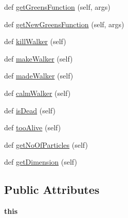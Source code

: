 \begin{DoxyCompactItemize}
\item 
def \hyperlink{classMontePython__cxx_1_1Walker_a0db4aec2ead92c5aec354c95ef433f41}{get\+Greens\+Function} (self, args)
\item 
def \hyperlink{classMontePython__cxx_1_1Walker_a26200102407bd7c0b87458f37d98bd94}{get\+New\+Greens\+Function} (self, args)
\item 
def \hyperlink{classMontePython__cxx_1_1Walker_a471dad9cff4877090c03a7a7bea66ebd}{kill\+Walker} (self)
\item 
def \hyperlink{classMontePython__cxx_1_1Walker_a3e1623e8d11e68f6bbf95e6972172548}{make\+Walker} (self)
\item 
def \hyperlink{classMontePython__cxx_1_1Walker_a034329e2b242f85405e282c90221ad9d}{made\+Walker} (self)
\item 
def \hyperlink{classMontePython__cxx_1_1Walker_a27a34599705ac3e484648a5f5f66f1aa}{calm\+Walker} (self)
\item 
def \hyperlink{classMontePython__cxx_1_1Walker_a7dc7e22d9542fcc9dc13a497c3285aaa}{is\+Dead} (self)
\item 
def \hyperlink{classMontePython__cxx_1_1Walker_a2dd9819a8ad6a3f59c3b7e97fa854924}{too\+Alive} (self)
\item 
def \hyperlink{classMontePython__cxx_1_1Walker_acf44f4b60751aad15651be601537d1a0}{get\+No\+Of\+Particles} (self)
\item 
def \hyperlink{classMontePython__cxx_1_1Walker_a232623f783f4ca455b2b8f3f0f626db6}{get\+Dimension} (self)
\end{DoxyCompactItemize}
\subsection*{Public Attributes}
\begin{DoxyCompactItemize}
\item 
\hypertarget{classMontePython__cxx_1_1Walker_a49e0c3fc49f76d0f3abe0d4a0ed11183}{}{\bfseries this}\label{classMontePython__cxx_1_1Walker_a49e0c3fc49f76d0f3abe0d4a0ed11183}

\end{DoxyCompactItemize}

